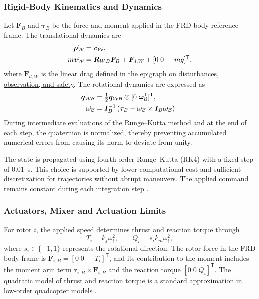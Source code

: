 \subsubsection*{Rigid-Body Kinematics and Dynamics}
\label{subsubsec:cinematica-dinamica-cuerpo}

Let $\bm{F}_B$ and $\bm{\tau}_B$ be the force and moment applied in the FRD body reference frame. The translational dynamics are
\begin{align}
 \dot{\bm{p}_{\mathcal{W}}} &= \bm{v}_{\mathcal{W}},\\
 m\dot{\bm{v}_{\mathcal{W}}} &= \bm{R}_{WB}\bm{F}_B+\bm{F}_{d,W}
                 +[0\;0\;-mg]^\mathsf{T},
 \label{eq:dinamica-traslacional}
\end{align}
where $\bm{F}_{d,W}$ is the linear drag defined in the \hyperref[subsubsec:perturbaciones-observacion-seguridad]{epigraph on disturbances, observation, and safety}. The rotational dynamics are expressed as
\begin{align}
 \dot{\bm{q}_{\mathcal{W}\mathcal{B}}} &= \tfrac{1}{2}\bm{q}_{\mathcal{W}\mathcal{B}}\otimes[0\;\bm{\omega}_{\mathcal{B}}^\mathsf{T}]^\mathsf{T},\\
 \dot{\bm{\omega}_{\mathcal{B}}} &= \bm{I}_B^{-1}
 \left(\bm{\tau}_B-\bm{\omega}_{\mathcal{B}}\times\bm{I}_B\bm{\omega}_{\mathcal{B}}\right).
 \label{eq:dinamica-rotacional}
\end{align}
During intermediate evaluations of the Runge--Kutta method and at the end of each step, the quaternion is normalized, thereby preventing accumulated numerical errors from causing its norm to deviate from unity.

The state is propagated using fourth-order Runge--Kutta (RK4) with a fixed step of \SI{0.01}{s}. This choice is supported by lower computational cost and sufficient discretization for trajectories without abrupt maneuvers. The applied command remains constant during each integration step \cite{butcher2016numerical}.

\subsubsection*{Actuators, Mixer and Actuation Limits}
\label{subsubsec:actuadores-mixer}

For rotor $i$, the applied speed determines thrust and reaction torque through
\begin{equation}
 T_i=k_f\omega_i^2,\qquad Q_i=s_i k_m\omega_i^2,
 \label{eq:rotor-cuadratico}
\end{equation}
where $s_i\in\{-1,1\}$ represents the rotational direction. The rotor force in the FRD body frame is $\bm{F}_{i,B}=[0\;0\;-T_i]^\mathsf{T}$, and its contribution to the moment includes the moment arm term $\bm{r}_{i,B}\times\bm{F}_{i,B}$ and the reaction torque $[0\;0\;Q_i]^\mathsf{T}$. The quadratic model of thrust and reaction torque is a standard approximation in low-order quadcopter models \cite{beard2012small,mellinger2011minimum}.

